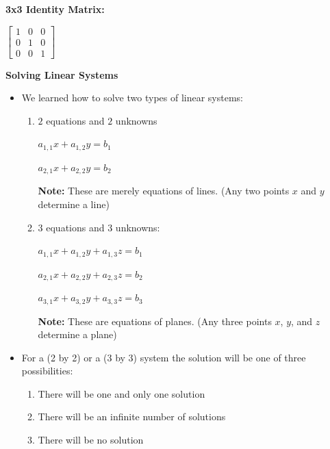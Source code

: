 \documentclass[12pt]{article}
\newenvironment{myindentpar}[1]%
     {\begin{list}{}%
             {\setlength{\leftmargin}{#1}}%
             \item[]%
     }
     {\end{list}}
\begin{document}
\vspace{.5cm}

\begin{myindentpar}{1cm}
\centerline{
\textbf{3x3 Identity Matrix:}}
\vspace{.5cm}
\centerline{
$\begin{bmatrix}                                        
       1 & 0& 0           \\[.5em]			
       0& 1 & 0 \\[.5em]       		
       0 & 0 & 1   		
     \end{bmatrix}$}
\end{myindentpar}

\newpage

\textbf{Solving Linear Systems}
\begin{itemize}
\item We learned how to solve two types of linear systems: 

\begin{enumerate}

\item $2$ equations and $2$ unknowns
\newline

\centerline{$a_{1,1}x + a_{1,2}y = b_{1}$}

\vspace{.3cm}

\centerline{$a_{2,1}x + a_{2,2}y = b_{2}$}

\textbf{Note:} These are merely equations of lines. (Any two points $x$ and $y$ determine a line)
\item $3$ equations and $3$ unknowns:
\newline

\centerline{$a_{1,1}x + a_{1,2}y + a_{1,3}z  = b_{1}$}

\vspace{.3cm}

\centerline{$a_{2,1}x + a_{2,2}y + a_{2,3}z  = b_{2}$}

\vspace{.3cm}

\centerline{$a_{3,1}x + a_{3,2}y + a_{3,3}z = b_{3}$}

\textbf{Note:} These are equations of planes. (Any three points $x$, $y$, and $z$ determine a plane)
\end{enumerate}

\item For a (2 by 2) or a (3 by 3) system the solution will be one of three possibilities:
\begin{enumerate}
\item There will be one and only one solution
\item There will be an infinite number of solutions
\item There will be no solution
\end{enumerate}


\end{itemize}
\end{document}
